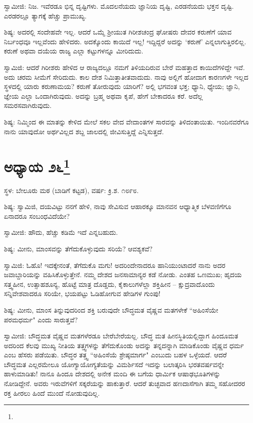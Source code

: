 ಸ್ವಾಮೀಜಿ: ನಿಜ. ಇವೆರಡೂ ಭಿನ್ನ ದೃಷ್ಟಿಗಳು. ಮೊದಲನೆಯದು ಜ್ಞಾನಿಯ ದೃಷ್ಟಿ, ಎರಡನೆಯದು ಭಕ್ತನ ದೃಷ್ಟಿ. ಎರಡರಲ್ಲೂ ತ್ಯಾಗಕ್ಕೆ ಹೆಚ್ಚು ಪ್ರಾಮುಖ್ಯ.

ಶಿಷ್ಯ: ಅದರಲ್ಲಿ ಸಂದೇಹವೇ ಇಲ್ಲ. ಆದರೆ ಒಮ್ಮೆ ಶ‍್ರೀಯುತ ಗಿರೀಶಚಂದ್ರ ಘೋಷರು ದೇವರ ಕರುಣೆಗೆ ಯಾವ ನಿರ್ಬಂಧವೂ ಇಲ್ಲವೆಂದು ಹೇಳಿದರು. ಅದಕ್ಕೊಂದು ಕಾಯಿದೆ ಇಲ್ಲ! ಇದ್ದಿದ್ದರೆ ಅದನ್ನು ‘ಕರುಣೆ’ ಎನ್ನಲಾಗುತ್ತಿರಲಿಲ್ಲ. ಕರುಣೆ ಅಥವಾ ದಯೆಯ ರಾಜ್ಯ ಎಲ್ಲಾ ಕಟ್ಟುಗಳನ್ನೂ ಮೀರಿದುದು.

ಸ್ವಾಮಿಜಿ: ಆದರೆ ಗಿರೀಶರು ಹೇಳಿದ ಆ ರಾಜ್ಯದಲ್ಲೂ ನಮಗೆ ತಿಳಿಯದಿರುವ ಬೇರೆ ಮಹತ್ತಾದ ಕಾಯಿದೆಗಳಿದ್ದೇ ಇವೆ. ಅದು ಚರಮ ಸೀಮೆಗೆ ಸೇರಿದುದು. ಕಾಲ ದೇಶ ನಿಮಿತ್ತಾತೀತವಾದುದು. ನಾವು ಅಲ್ಲಿಗೆ ಹೋದಾಗ ಕಾರಣಗಳೇ ಇಲ್ಲದ ಸ್ಥಳದಲ್ಲಿ ಯಾರು ಕರುಣಾಮಯ? ಕರುಣೆ ತೋರುವುದು ಯಾರಿಗೆ? ಅಲ್ಲಿ ಭಗವಂತ ಭಕ್ತ; ಧ್ಯಾನಿ, ಧ್ಯೇಯ; ಜ್ಞಾನಿ, ಜ್ಞೇಯ ಎಲ್ಲಾ ಒಂದಾಗಿರುವುದು. ಅದನ್ನು ಬ್ರಹ್ಮ ಅಥವಾ ಕೃಪೆ, ಹೇಗೆ ಬೇಕಾದರೂ ಕರೆ. ಅದೆಲ್ಲ ಸಮರಸವಾಗಿರುವುದು.

ಶಿಷ್ಯ: ನಿಮ್ಮಿಂದ ಈ ಮಾತನ್ನು ಕೇಳಿದ ಮೇಲೆ ಸಕಲ ವೇದ ವೇದಾಂತಗಳ ಸಾರವನ್ನು ತಿಳಿದಂತಾಯಿತು. ಇಂದಿನವರೆಗೂ ನಾನು ಯಾವುದೋ ಅರ್ಥವಿಲ್ಲದ ಶಬ್ದ ಜಾಲದಲ್ಲಿ ಜೀವಿಸುತ್ತಿದ್ದೆ ಎನ್ನಿಸುತ್ತದೆ.

\newpage

\chapter[ಅಧ್ಯಾಯ ೨೬]{ಅಧ್ಯಾಯ ೨೬\protect\footnote{}}

\centerline{ಸ್ಥಳ: ಬೇಲೂರು ಮಠ (ಬಾಡಿಗೆ ಕಟ್ಟಡ), ವರ್ಷ: ಕ್ರಿ.ಶ. ೧೮೯೮.}

ಶಿಷ್ಯ: ಸ್ವಾಮಿಜಿ, ದಯವಿಟ್ಟು ನನಗೆ ಹೇಳಿ, ನಾವು ಸೇವಿಸುವ ಆಹಾರಕ್ಕೂ ಮಾನವನ ಆಧ್ಯಾತ್ಮಿಕ ಬೆಳವಣಿಗೆಗೂ ಏನಾದರೂ ಸಂಬಂಧವಿದೆಯೇ?

ಸ್ವಾಮೀಜಿ: ಹೌದು, ಹೆಚ್ಚು ಕಡಿಮೆ ಇದೆ ಎನ್ನಬಹುದು.

ಶಿಷ್ಯ: ಮೀನು, ಮಾಂಸವನ್ನು ತೆಗೆದುಕೊಳ್ಳುವುದು ಸರಿಯೆ? ಆವಶ್ಯಕವೆ?

ಸ್ವಾಮಿಜಿ: ಓಹೊ! ಇದಕ್ಕೇನಂತೆ, ತೆಗೆದುಕೊ ಮಗು! ಅದರಿಂದೇನಾದರೂ ಹಾನಿಯುಂಟಾದರೆ ನಾನು ಅದರ ಜವಾಬ್ದಾರಿಯನ್ನು ವಹಿಸಿಕೊಳ್ಳುತ್ತೇನೆ. ನಮ್ಮ ದೇಶದ ಜನಸಾಮಾನ್ಯರ ಕಡೆ ನೋಡು. ಎಂತಹ ಒಣಮುಖ; ಹೃದಯ ಸತ್ತ್ವಹೀನ, ಉತ್ಸಾಹಶೂನ್ಯ, ಹೊಟ್ಟೆ ಮಾತ್ರ ದೊಡ್ಡದು, ಕೈಕಾಲುಗಳೆಲ್ಲಾ ಶಕ್ತಿಹೀನ – ಕ್ಷುದ್ರವಾದೊಂದು ಸನ್ನಿವೇಶವಾದರೂ ಸರಿಯೇ, ಭಯಪಟ್ಟು ಓಡಿಹೋಗುವ ಹೇಡಿಗಳ ಗುಂಪು!

ಶಿಷ್ಯ: ಮೀನು, ಮಾಂಸ ತಿನ್ನುವುದರಿಂದ ಶಕ್ತಿ ಬರುವುದೇ ಬೌದ್ಧಮತ ವೈಷ್ಣವ ಮತಗಳೇಕೆ “ಅಹಿಂಸೆಯೇ ಪರಮಧರ್ಮ" ಎಂದು ಸಾರುತ್ತವೆ?

ಸ್ವಾಮೀಜಿ: ಬೌದ್ಧಮತ ವೈಷ್ಣವ ಮತಗಳೆರಡೂ ಬೇರೆಬೇರೆಯಲ್ಲ. ಬೌದ್ಧ ಮತ ಹೀನಸ್ಥಿತಿಯಲ್ಲಿದ್ದಾಗ ಹಿಂದೂಮತ ಅದರಿಂದ ಕೆಲವು ಮುಖ್ಯ ನೀತಿಯ ತತ್ತ್ವಗಳನ್ನು ತೆಗೆದುಕೊಂಡು ಅದನ್ನು ತನ್ನದನ್ನಾಗಿ ಮಾಡಿಕೊಂಡು ವೈಷ್ಣವ ಧರ್ಮ ಎಂಬ ಹೆಸರು ಪಡೆಯಿತು. ಬೌದ್ಧರ ತತ್ತ್ವ “ಅಹಿಂಸೆಯೆ ಶ್ರೇಷ್ಠಮಾರ್ಗ" ಎಂಬುದು ಬಹಳ ಒಳ್ಳೆಯದೆ. ಆದರೆ ಬೌದ್ಧಮತ ಎಲ್ಲರಮೇಲೂ ಯೋಗ್ಯಾಯೋಗ್ಯತೆಯನ್ನು ವಿಮರ್ಶಿಸದೆ ಇದನ್ನು ಬಲಾತ್ಕರಿಸಿ ಭರತವರ್ಷವನ್ನೇ ಹಾಳುಮಾಡಿತು! ನಾನೂ ಹಿಂದೂ ದೇಶದಲ್ಲಿ ಅನೇಕ ಮಂದಿ ಈ ಬಗೆಯ ಧಾರ್ಮಿಕ ಆಷಾಢಭೂತಿಗಳನ್ನು ನೋಡಿದ್ದೇನೆ. ಅವರು ಇರುವೆಗಳಿಗೆ ಸಕ್ಕರೆಯನ್ನು ಹಾಕುತ್ತಾರೆ. ಆದರೆ ತುಚ್ಛವಾದ ಹಣದಾಸೆಗಾಗಿ ತಮ್ಮ ಸಹೋದರರ ರಕ್ತ ಹೀರಲು ಹಿಂದೆ ಮುಂದೆ ನೋಡುವುದಿಲ್ಲ.

